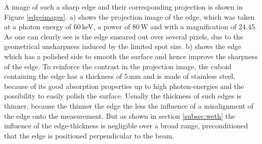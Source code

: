 A image of such a sharp edge and their corresponding projection is shown in Figure \ref{edgeimages}. a) shows the projection image of the edge, which was taken at a photon energy of $60\,$keV, a power of $80\,$W and with a magnification of $24.45$. As one can clearly see is the edge smeared out over several pixels, due to the geometrical unsharpness induced by the limited spot size. b) shows the edge which has a polished side to smooth the surface and hence improve the sharpness of the edge. To reinforce the contrast in the projection image, the cuboid containing the edge has a thickness of $5\,$mm and is made of stainless steel, because of its good absorption properties up to high photon-energies and the possibility to easily polish the surface. Usually the thickness of such edges is thinner, because the thinner the edge the less the influence of a misalignment of the edge onto the measurement. But as shown in section \ref{subsec:weth} the influence of the edge-thickness is negligible over a broad range, preconditioned that the edge is positioned perpendicular to the beam.

